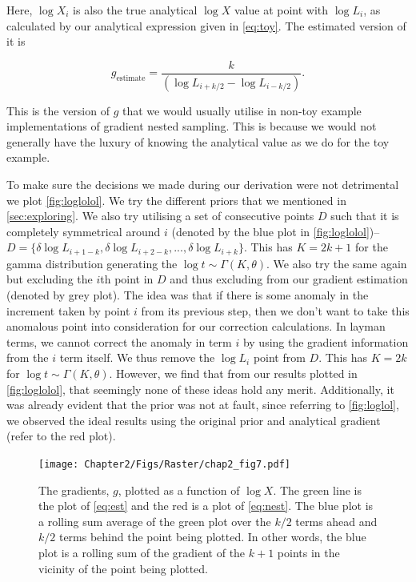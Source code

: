 Here, $\log X_i$ is also the true analytical $\log X$ value at point with $\log L_i$, as calculated by our analytical expression given in \cref{eq:toy}. The estimated version of it is 

\begin{equation}
   g_{\mathrm{estimate}}= \frac{k}{(\log L_{i+k/2}-\log L_{i-k/2})}.
\label{eq:est}
\end{equation}


This is the version of $g$ that we would usually utilise in non-toy example implementations of gradient nested sampling. This is because we would not generally have the luxury of knowing the analytical value as we do for the toy example. 


To make sure the decisions we made during our derivation were not detrimental we plot \cref{fig:loglolol}. We try the different priors that we mentioned in \cref{sec:exploring}. We also try utilising a set of consecutive points $D$ such that it is completely symmetrical around $i$ (denoted by the blue plot in \cref{fig:loglolol})--$D= \{ \delta \log L_{i+1-k},\delta \log L_{i+2-k},...,\delta \log L_{i+k} \}$. This has $K=2k+1$ for the gamma distribution generating the $\log t \sim \Gamma(K,\theta)$. We also try the same again but excluding the $i$th point in $D$ and thus excluding from our gradient estimation (denoted by grey plot). The idea was that if there is some anomaly in the increment taken by point $i$ from its previous step, then we don't want to take this anomalous point into consideration for our correction calculations. In layman terms, we cannot correct the anomaly in term $i$ by using the gradient information from the $i$ term itself. We thus remove the $\log L_i$ point from $D$. This has $K=2k$ for $\log t \sim \Gamma(K,\theta)$. However, we find that from our results plotted in \cref{fig:loglolol}, that seemingly none of these ideas hold any merit. Additionally, it was already evident that the prior was not at fault, since referring to \cref{fig:loglol}, we observed the ideal results using the original prior and analytical gradient (refer to the red plot).


\begin{figure} 
\centering    
\texttt{[image: Chapter2/Figs/Raster/chap2\_fig7.pdf]}
\caption{ The gradients, $g$, plotted as a function of $\log X$. The green line is the plot of \cref{eq:est} and the red is a plot of \cref{eq:nest}. The blue plot is a rolling sum average of the green plot over the $k/2$ terms ahead and $k/2$ terms behind the point being plotted. In other words, the blue plot is a rolling sum of the gradient of the $k+1$ points in the vicinity of the point being plotted.}

\label{fig:fffff}
\end{figure}

